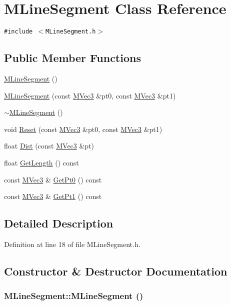 \hypertarget{class_m_line_segment}{
\section{MLineSegment Class Reference}
\label{class_m_line_segment}
}
{\tt \#include $<$MLineSegment.h$>$}

\subsection*{Public Member Functions}
\begin{CompactItemize}
\item 
\hyperlink{class_m_line_segment_3ef8707c6f1a490742ff868bd9f70028}{MLineSegment} ()
\item 
\hyperlink{class_m_line_segment_0c74581a94c2432cd5e0f3cbb6d82db1}{MLineSegment} (const \hyperlink{class_m_vec3}{MVec3} \&pt0, const \hyperlink{class_m_vec3}{MVec3} \&pt1)
\item 
\hyperlink{class_m_line_segment_32648c0bc4d668c8949519b55472336a}{$\sim$MLineSegment} ()
\item 
void \hyperlink{class_m_line_segment_ce31a90c5d0f400ff1bf9e8f5ca6b0ea}{Reset} (const \hyperlink{class_m_vec3}{MVec3} \&pt0, const \hyperlink{class_m_vec3}{MVec3} \&pt1)
\item 
float \hyperlink{class_m_line_segment_cd96fcdb670fc3ce07abf93372130631}{Dist} (const \hyperlink{class_m_vec3}{MVec3} \&pt)
\item 
float \hyperlink{class_m_line_segment_867d62804ae811b05cac8068c8e8130b}{GetLength} () const 
\item 
const \hyperlink{class_m_vec3}{MVec3} \& \hyperlink{class_m_line_segment_1e807174673d4e2a603434ada6097c2d}{GetPt0} () const 
\item 
const \hyperlink{class_m_vec3}{MVec3} \& \hyperlink{class_m_line_segment_2b714095316270b8763c51a8f799e68f}{GetPt1} () const 
\end{CompactItemize}


\subsection{Detailed Description}


Definition at line 18 of file MLineSegment.h.

\subsection{Constructor \& Destructor Documentation}
\hypertarget{class_m_line_segment_3ef8707c6f1a490742ff868bd9f70028}{
\subsubsection[{MLineSegment}]{\setlength{\rightskip}{0pt plus 5cm}MLineSegment::MLineSegment ()}}
\label{class_m_line_segment_3ef8707c6f1a490742ff868bd9f70028}




